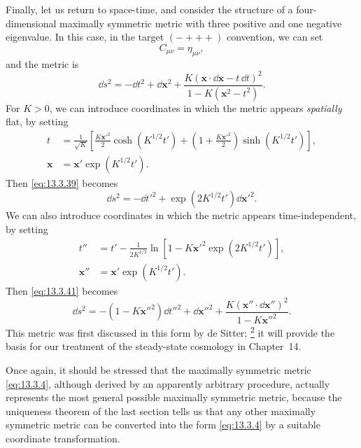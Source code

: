 Finally, let us return to space-time, and consider the structure of a
four-dimensional maximally symmetric metric with three positive and one
negative eigenvalue. In this case, in the target \((-+++)\) convention, we
can set
\begin{equation}
  C_{\mu\nu}=\eta_{\mu\nu},
  \tag{13.3.38}\label{eq:13.3.38}
\end{equation}
and the metric is
\begin{equation}
  \dd s^2
  =
  -\dd t^2+\dd\mathbf{x}^2
  +
  \frac{
    K\left(\mathbf{x}\cdot\dd\mathbf{x}-t\,\dd t\right)^2
  }{
    1-K\left(\mathbf{x}^2-t^2\right)
  }.
  \tag{13.3.39}\label{eq:13.3.39}
\end{equation}
For \(K>0\), we can introduce coordinates in which the metric appears
\emph{spatially} flat, by setting
\begin{equation}
  \begin{aligned}
  t
  &=
  \frac1{\sqrt K}
  \left[
    \frac{K\mathbf{x}'^2}{2}\cosh\!\left(K^{1/2}t'\right)
    +
    \left(1+\frac{K\mathbf{x}'^2}{2}\right)
    \sinh\!\left(K^{1/2}t'\right)
  \right],
  \\
  \mathbf{x}
  &=
  \mathbf{x}'\exp\!\left(K^{1/2}t'\right).
  \end{aligned}
  \tag{13.3.40}\label{eq:13.3.40}
\end{equation}
Then \eqref{eq:13.3.39} becomes
\begin{equation}
  \dd s^2
  =
  -\dd t'^2
  +\exp\!\left(2K^{1/2}t'\right)\dd\mathbf{x}'^2.
  \tag{13.3.41}\label{eq:13.3.41}
\end{equation}
We can also introduce coordinates in which the metric appears
time-independent, by setting
\begin{equation}
  \begin{aligned}
  t''
  &=
  t'
  -
  \frac1{2K^{1/2}}
  \ln\!\left[
    1-K\mathbf{x}'^2\exp\!\left(2K^{1/2}t'\right)
  \right],
  \\
  \mathbf{x}''
  &=
  \mathbf{x}'\exp\!\left(K^{1/2}t'\right).
  \end{aligned}
  \tag{13.3.42}\label{eq:13.3.42}
\end{equation}
Then \eqref{eq:13.3.41} becomes
\begin{equation}
  \dd s^2
  =
  -\left(1-K\mathbf{x}''^2\right)\dd t''^2
  +\dd\mathbf{x}''^2
  +
  \frac{
    K\left(\mathbf{x}''\cdot\dd\mathbf{x}''\right)^2
  }{
    1-K\mathbf{x}''^2
  }.
  \tag{13.3.43}\label{eq:13.3.43}
\end{equation}
This metric was first discussed in this form by de Sitter;%
\hyperref[ch13-ref-2]{\textsuperscript{2}} it will provide the basis for our
treatment of the steady-state cosmology in Chapter~14.

Once again, it should be stressed that the maximally symmetric metric
\eqref{eq:13.3.4}, although derived by an apparently arbitrary procedure,
actually represents the most general possible maximally symmetric metric,
because the uniqueness theorem of the last section tells us that any other
maximally symmetric metric can be converted into the form
\eqref{eq:13.3.4} by a suitable coordinate transformation.
